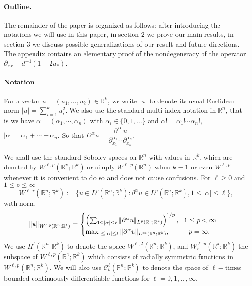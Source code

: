 \documentclass[letterpaper,11pt]{article}
\newcommand{\R}{\mathbb{R}}
\numberwithin{equation}{section}
\theoremstyle{plain}
\theoremstyle{remark}
\begin{document}
\paragraph{Outline.}The remainder of the paper is organized as follows: after introducing the notations we will use in this paper, in section $2$ we prove our main results, in section $3$ we discuss possible generalizations of our result and future directions. The appendix contains an elementary proof of the nondegeneracy of the operator $\partial_{xx}-d^{-1}(1-2u_*)$. 

\paragraph{Notation.}

For a vector $u=(u_1,\ldots,u_k) \in \R^k$, we write $|u|$ to denote its usual Euclidean norm $|u| = \sum_{i=1}^{k} u_i^2$. We also use the standard multi-index notation in $\R^n$, that is we have $\alpha = (\alpha_1,\cdots,\alpha_n)$ with $\alpha_i \in \{0,1,\ldots \}$ and $\alpha! = \alpha_1!\cdots\alpha_n!$, $|\alpha|=\alpha_1+\cdots+\alpha_n$. So that 
$D^\alpha u = \dfrac{\partial^{|\alpha |} u}{\partial_{x_1}^{\alpha_1}\cdots \partial_{x_n}^{\alpha_n}}$.

We shall use the standard Sobolev spaces on $\R^n$ with values in $\R^k$, which are denoted by $W^{\ell,p}(\R^n; \R^k)$ or simply $W^{\ell,p}(\R^n)$ when $k=1$ or even $W^{\ell,p}$ whenever it is convenient to do so and does not cause confusions. For $\ell \ge 0$ and $1\le p \le \infty$
\[
W^{\ell,p}(\R^n;\R^k) := \{ u \in L^p(\R^n;\R^k): \partial^\alpha u \in L^p(\R^n;\R^k), 1\le |\alpha| \le \ell \},
\]
with norm
\[
\|u\|_{W^{\ell,p}(\R^n;\R^k)}=
\begin{cases}
\left(\sum_{1\le |\alpha| \le \ell} \|\partial^\alpha u \|_{L^p(\R^n;\R^k)}\right)^{1/p}, \hspace{0.1in}1\le p<\infty \\
\max_{1\le |\alpha| \le \ell}\|\partial^\alpha u\|_{L^\infty(\R^n;\R^k)}, \hspace{0.4in} p=\infty.
\end{cases}
\]
We use $H^\ell(\R^n;\R^k)$ to denote the space $W^{\ell,2}(\R^n;\R^k)$, and $W^{\ell,p}_r(\R^n;\R^k)$ the subspace of $W^{\ell,p}(\R^n;\R^k)$ which consists of radially symmetric functions in $W^{\ell,p}(\R^n;\R^k)$. We will also use $\mathscr{C}_b^\ell(\R^n;\R^k)$ to denote the space of $\ell-$times bounded continuously differentiable functions for $\ell=0,1,\ldots,\infty$.
 
\end{document}
